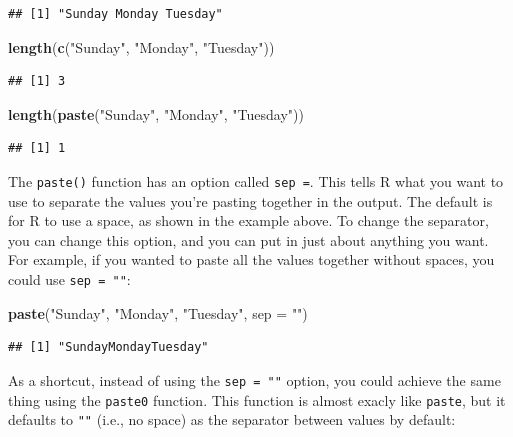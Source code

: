 \documentclass[]{book}
\makeatletter
\newenvironment{Shaded}{\begin{snugshade}}{\end{snugshade}}
\newcommand{\KeywordTok}[1]{\textcolor[rgb]{0.13,0.29,0.53}{\textbf{#1}}}
\newcommand{\DataTypeTok}[1]{\textcolor[rgb]{0.13,0.29,0.53}{#1}}
\newcommand{\StringTok}[1]{\textcolor[rgb]{0.31,0.60,0.02}{#1}}
\newcommand{\NormalTok}[1]{#1}
\newenvironment{kframe}{%
\medskip{}
\setlength{\fboxsep}{.8em}
 \def\at@end@of@kframe{}%
 \ifinner\ifhmode%
  \def\at@end@of@kframe{\end{minipage}}%
  \begin{minipage}{\columnwidth}%
 \fi\fi%
 \def\FrameCommand##1{\hskip\@totalleftmargin \hskip-\fboxsep
 \colorbox{shadecolor}{##1}\hskip-\fboxsep
     \hskip-\linewidth \hskip-\@totalleftmargin \hskip\columnwidth}%
 \MakeFramed {\advance\hsize-\width
   \@totalleftmargin\z@ \linewidth\hsize
   \@setminipage}}%
 {\par\unskip\endMakeFramed%
 \at@end@of@kframe}
\renewenvironment{Shaded}{\begin{kframe}}{\end{kframe}}
\theoremstyle{definition}
\theoremstyle{definition}
\theoremstyle{definition}
\theoremstyle{remark}
\makeatother
\begin{document}
\begin{verbatim}
## [1] "Sunday Monday Tuesday"
\end{verbatim}

\begin{Shaded}
\begin{Highlighting}[]
\KeywordTok{length}\NormalTok{(}\KeywordTok{c}\NormalTok{(}\StringTok{"Sunday"}\NormalTok{, }\StringTok{"Monday"}\NormalTok{, }\StringTok{"Tuesday"}\NormalTok{))}
\end{Highlighting}
\end{Shaded}

\begin{verbatim}
## [1] 3
\end{verbatim}

\begin{Shaded}
\begin{Highlighting}[]
\KeywordTok{length}\NormalTok{(}\KeywordTok{paste}\NormalTok{(}\StringTok{"Sunday"}\NormalTok{, }\StringTok{"Monday"}\NormalTok{, }\StringTok{"Tuesday"}\NormalTok{))}
\end{Highlighting}
\end{Shaded}

\begin{verbatim}
## [1] 1
\end{verbatim}

The \texttt{paste()} function has an option called \texttt{sep\ =}. This
tells R what you want to use to separate the values you're pasting
together in the output. The default is for R to use a space, as shown in
the example above. To change the separator, you can change this option,
and you can put in just about anything you want. For example, if you
wanted to paste all the values together without spaces, you could use
\texttt{sep\ =\ ""}:

\begin{Shaded}
\begin{Highlighting}[]
\KeywordTok{paste}\NormalTok{(}\StringTok{"Sunday"}\NormalTok{, }\StringTok{"Monday"}\NormalTok{, }\StringTok{"Tuesday"}\NormalTok{, }\DataTypeTok{sep =} \StringTok{""}\NormalTok{)}
\end{Highlighting}
\end{Shaded}

\begin{verbatim}
## [1] "SundayMondayTuesday"
\end{verbatim}

As a shortcut, instead of using the \texttt{sep\ =\ ""} option, you
could achieve the same thing using the \texttt{paste0} function. This
function is almost exacly like \texttt{paste}, but it defaults to
\texttt{""} (i.e., no space) as the separator between values by default:
\end{document}
